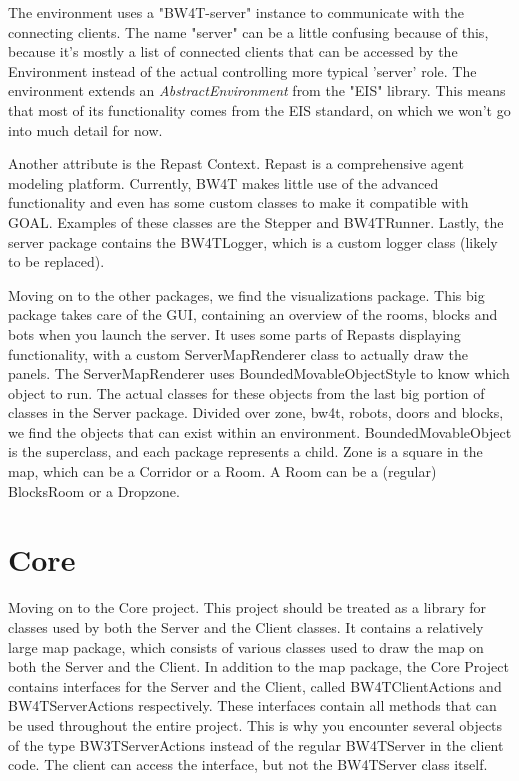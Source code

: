 \documentclass{article}
\begin{document}
The environment uses a "BW4T-server" instance to communicate with the connecting clients. The name "server" can be a little confusing because of this, because it's mostly a list of connected clients that can be accessed by the Environment instead of the actual controlling more typical 'server' role.
The environment extends an \emph{AbstractEnvironment} from the "EIS" library. This means that most of its functionality comes from the EIS standard, on which we won't go into much detail for now. 

Another attribute is the Repast Context. Repast is a comprehensive agent modeling platform. Currently, BW4T makes little use of the advanced functionality and even has some custom classes to make it compatible with GOAL. Examples of these classes are the Stepper and BW4TRunner. Lastly, the server package contains the BW4TLogger, which is a custom logger class (likely to be replaced). %

Moving on to the other packages, we find the visualizations package. This big package takes care of the GUI, containing an overview of the rooms, blocks and bots when you launch the server. It uses some parts of Repasts displaying functionality, with a custom ServerMapRenderer class to actually draw the panels. The ServerMapRenderer uses BoundedMovableObjectStyle to know which object to run. The actual classes for these objects from the last big portion of classes in the Server package. Divided over zone, bw4t, robots, doors and blocks, we find the objects that can exist within an environment. BoundedMovableObject is the superclass, and each package represents a child. Zone is a square in the map, which can be a Corridor or a Room. A Room can be a (regular) BlocksRoom or a Dropzone. 

\section*{Core}
Moving on to the Core project. This project should be treated as a library for classes used by both the Server and the Client classes. It contains a relatively large map package, which consists of various classes used to draw the map on both the Server and the Client. In addition to the map package, the Core Project contains interfaces for the Server and the Client, called BW4TClientActions and BW4TServerActions respectively. These interfaces contain all methods that can be used throughout the entire project. This is why you encounter several objects of the type BW3TServerActions instead of the regular BW4TServer in the client code. The client can access the interface, but not the BW4TServer class itself. 
\end{document}
